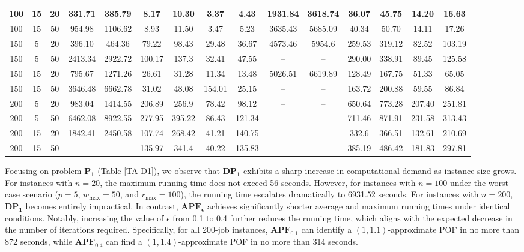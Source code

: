 \documentclass[12pt]{article}
\begin{document}
\begin{sloppypar}
\begin{table}[H]
\begin{center}
\begin{tabular}{|ccc|cc|cc|cc|cc|cc|cc|}
100 & 15 & 20 & 331.71 & 385.79 & 8.17 & 10.30 & 3.37 & 4.43 & 1931.84 & 3618.74 & 36.07 & 45.75 & 14.20 &	16.63 \\ \hline
100 & 15 & 50 & 954.98 & 1106.62 & 8.93 & 11.50 & 3.47 & 5.23 & 3635.43 & 5685.09 & 40.34	& 50.70 & 14.11 & 17.26 \\ \hline
150 & 5 & 20 & 396.10 & 464.36 & 79.22 & 98.43 & 29.48 & 36.67 & 4573.46 & 5954.6 & 259.53 & 319.12 & 82.52 & 103.19 \\ \hline
150 & 5 & 50 & 2413.34 & 2922.72 & 100.17 &	137.3 & 32.41 &	47.55 & --& -- & 290.00 & 338.91 & 89.45 & 125.58 \\ \hline
150 & 15 & 20 & 795.67 & 1271.26 & 26.61 & 31.28	& 11.34 & 13.48 & 5026.51 & 6619.89 & 128.49 & 167.75 &	51.33 & 65.05 \\ \hline
150 & 15 & 50 & 3646.48 & 6662.78 & 31.02 & 48.08 & 154.01 & 25.15 & --& -- & 163.72 & 200.88 & 59.55 & 86.84 \\ \hline
200 & 5 & 20 & 983.04 & 1414.55	& 206.89 & 256.9 & 78.42 & 98.12 & --& -- & 650.64 & 773.28	& 207.40 & 251.81 \\ \hline
200 & 5 & 50 & 6462.08 & 8922.55 & 277.95 &	395.22 & 86.43 & 121.34 & --& -- & 711.46 &	871.91 & 231.58	& 313.43 \\ \hline
200 & 15 & 20 & 1842.41 & 2450.58 & 107.74 & 268.42 & 41.21 & 140.75 & --& -- & 332.6 & 366.51 & 132.61 & 210.69 \\ \hline
200 & 15 & 50 & --& -- & 135.97 & 341.4 & 40.22 & 135.83 & --& -- & 385.19 &	486.42 & 181.83	& 297.81 \\ \hline
\end{tabular}
\end{center}
\end{table}

Focusing on problem $\mathbf{P_1}$ (Table \ref{TA-D1}), we observe that $\mathbf{DP_1}$ exhibits a sharp increase in computational demand as instance size grows. For instances with $n=20$, the maximum running time does not exceed 56 seconds. However, for instances with $n=100$ under the worst-case scenario ($p=5$, $w_{\max}=50$, and $r_{\max}=100$), the running time escalates dramatically to 6931.52 seconds. For instances with $n=200$, $\mathbf{DP_1}$ becomes entirely impractical. In contrast, $\mathbf{APF_{\epsilon}}$ achieves significantly shorter average and maximum running times under identical conditions. Notably, increasing the value of $\epsilon$ from 0.1 to 0.4 further reduces the running time, which aligns with the expected decrease in the number of iterations required. Specifically, for all 200-job instances, $\mathbf{APF_{0.1}}$ can identify a $(1, 1.1)$-approximate POF in no more than 872 seconds, while $\mathbf{APF_{0.4}}$ can find a $(1, 1.4)$-approximate POF in no more than 314 seconds. 


\end{sloppypar}
\end{document}
